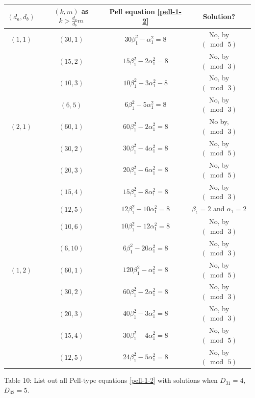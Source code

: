 \documentclass[12pt]{article}
\begin{document}
\begin{center}
\begin{tabular}{|c|c|c|c|}
\hline $(d_a, d_b)$ & $(k, m)$ as $k > \frac{d_a}{d_b} m$ & Pell equation \eqref{pell-1-2} & Solution? \\
\hline $(1,1)$ & $(30,1)$ & $30\beta_1^2-\alpha_1^2=8$ & No, by $(\bmod \, 5)$\\
\hline & $(15,2)$ & $15\beta_1^2-2\alpha_1^2=8$ & No, by $(\bmod \, 3)$\\
\hline & $(10,3)$ & $10\beta_1^2-3\alpha_1^2-8$ & No, by $(\bmod \, 3)$\\
\hline & $(6,5)$ & $6\beta_1^2-5\alpha_1^2=8$ & No, by $(\bmod \, 3)$\\
\hline $(2,1)$ & $(60,1)$ & $60\beta_1^2-2\alpha_1^2=8$ & No by,  $(\bmod \, 3)$\\
\hline & $(30,2)$ & $30\beta_1^2-4\alpha_1^2=8$ & No, by $(\bmod \, 5)$\\
\hline & $(20,3)$ & $20\beta_1^2-6\alpha_1^2=8$ & No, by $(\bmod \, 5)$\\
\hline & $(15,4)$ & $15\beta_1^2-8\alpha_!^2=8$ & No, by $(\bmod \, 3)$\\
\hline & $(12,5)$ & $12\beta_1^2-10\alpha_1^2=8$ & $\beta_1=2$ and $\alpha_1=2$\\
\hline & $(10,6)$ & $10\beta_1^2-12\alpha_1^2=8$ & No, by $(\bmod \, 3)$\\
\hline & $(6,10)$ & $6\beta_1^2-20\alpha_1^2=8$ & No, by $(\bmod \, 3)$\\
\hline $(1,2)$ & $(60,1)$ & $120\beta_1^2-\alpha_1^2=8$ & No, by $(\bmod \, 5)$\\
\hline & $(30,2)$ & $60\beta_1^2-2\alpha_1^2=8$ & No, by $(\bmod \, 3)$\\
\hline & $(20,3)$ & $40\beta_1^2-3\alpha_1^2=8$ & No, by $(\bmod \, 3)$\\
\hline & $(15,4)$ & $30\beta_1^2-4\alpha_1^2=8$ & No, by $(\bmod \, 5)$\\
\hline & $(12,5)$ & $24\beta_1^2-5\alpha_1^2=8$ & No, by $(\bmod \, 5)$\\
\hline
\end{tabular}
\newline \small{Table 10: List out all Pell-type equations \eqref{pell-1-2} with solutions when $D_{31} = 4$, $D_{32} = 5$.}
\end{center}

\end{document}
